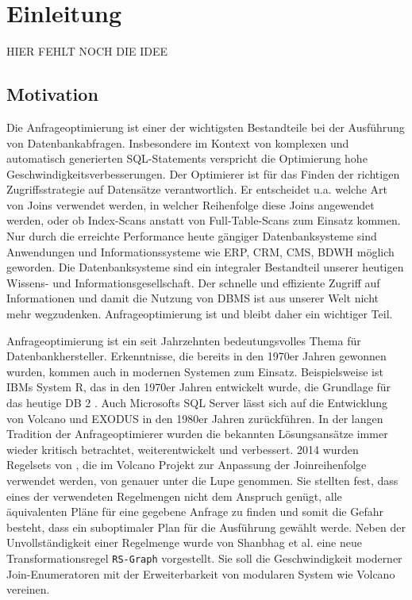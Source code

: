 \chapter{Einleitung}


HIER FEHLT NOCH DIE IDEE


\section{Motivation}


Die Anfrageoptimierung ist einer der wichtigsten Bestandteile bei der Ausführung von Datenbankabfragen. Insbesondere im Kontext von komplexen und automatisch generierten SQL-Statements verspricht die Optimierung hohe Geschwindigkeitsverbesserungen. Der Optimierer ist für das Finden der richtigen Zugriffsstrategie auf Datensätze verantwortlich. Er entscheidet u.a. welche Art von Joins verwendet werden, in welcher Reihenfolge diese Joins angewendet werden, oder ob Index-Scans anstatt von Full-Table-Scans zum Einsatz kommen. Nur durch die erreichte Performance heute gängiger Datenbanksysteme sind Anwendungen und Informationssysteme wie \ac{ERP}, \ac{CRM}, \ac{CMS}, \ac{BDWH} möglich geworden. Die Datenbanksysteme sind ein integraler Bestandteil unserer heutigen Wissens- und Informationsgesellschaft. Der schnelle und effiziente Zugriff auf Informationen und damit die Nutzung von \ac{DBMS} ist aus unserer Welt nicht mehr wegzudenken. Anfrageoptimierung ist und bleibt daher ein wichtiger Teil.

Anfrageoptimierung ist ein seit Jahrzehnten bedeutungsvolles Thema für Datenbankhersteller. Erkenntnisse, die bereits in den 1970er Jahren gewonnen wurden, kommen auch in modernen Systemen zum Einsatz. Beispielsweise ist IBMs System R, das in den 1970er Jahren entwickelt wurde, die Grundlage für das heutige DB 2  \cite{wade2012ibm}. Auch Microsofts SQL Server lässt sich auf die Entwicklung von Volcano und EXODUS in den 1980er Jahren zurückführen.
In der langen Tradition der Anfrageoptimierer wurden die bekannten Lösungsansätze immer wieder kritisch betrachtet, weiterentwickelt und verbessert. 2014 wurden Regelsets von \cite{pellenkoft1997complexity}, die im Volcano Projekt zur Anpassung der Joinreihenfolge verwendet werden, von \cite{shanbhag2014optimizing} genauer unter die Lupe genommen.
Sie stellten fest, dass eines der verwendeten Regelmengen nicht dem Anspruch genügt, alle äquivalenten Pläne für eine gegebene Anfrage zu finden und somit die Gefahr besteht, dass ein suboptimaler Plan für die Ausführung gewählt werde. Neben der Unvollständigkeit einer Regelmenge wurde von Shanbhag et al. eine neue Transformationsregel \texttt{RS-Graph} vorgestellt. Sie soll die Geschwindigkeit moderner Join-Enumeratoren mit der Erweiterbarkeit von modularen System wie Volcano vereinen.

